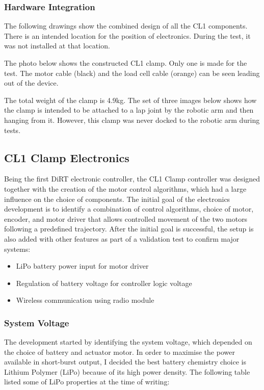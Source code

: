 \subsubsection{Hardware Integration}
The following drawings show the combined design of all the CL1 components. There is an intended location for the position of electronics. During the test, it was not installed at that location.


The photo below shows the constructed CL1 clamp. Only one is made for the test. The motor cable (black) and the load cell cable (orange) can be seen leading out of the device.

The total weight of the clamp is 4.9kg.
The set of three images below shows how the clamp is intended to be attached to a lap joint by the robotic arm and then hanging from it. However, this clamp was never docked to the robotic arm during tests.


\subsection{CL1 Clamp Electronics}
Being the first DiRT electronic controller, the CL1 Clamp controller was designed together with the creation of the motor control algorithms, which had a large influence on the choice of components. The initial goal of the electronics development is to identify a combination of control algorithms, choice of motor, encoder, and motor driver that allows controlled movement of the two motors following a predefined trajectory.
After the initial goal is successful, the setup is also added with other features as part of a validation test to confirm major systems:

\begin{itemize}
    \item LiPo battery power input for motor driver
    \item Regulation of battery voltage for controller logic voltage
    \item Wireless communication using radio module
\end{itemize}

\subsubsection{System Voltage}
The development started by identifying the system voltage, which depended on the choice of battery and actuator motor. In order to maximise the power available in short-burst output, I decided the best battery chemistry choice is Lithium Polymer (LiPo) because of its high power density. The following table listed some of LiPo properties at the time of writing:

